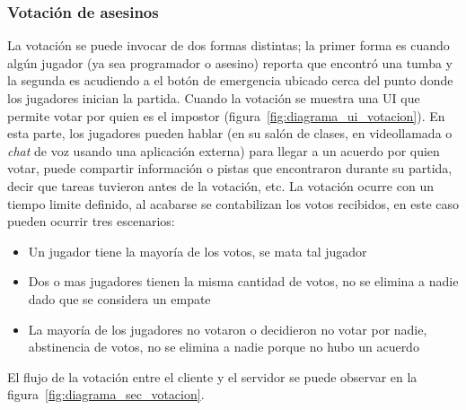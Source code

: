 \subsubsection{Votación de asesinos}
La votación se puede invocar de dos formas distintas; la primer forma es cuando algún jugador (ya sea programador o asesino) reporta que encontró una tumba y la segunda es acudiendo a el botón de emergencia ubicado cerca del punto donde los jugadores inician la partida. Cuando la votación se muestra una UI que permite votar por quien es el impostor (figura~\ref{fig:diagrama_ui_votacion}). En esta parte, los jugadores pueden hablar (en su salón de clases, en videollamada o \textit{chat} de voz usando una aplicación externa) para llegar a un acuerdo por quien votar, puede compartir información o pistas que encontraron durante su partida, decir que tareas tuvieron antes de la votación, etc. La votación ocurre con un tiempo limite definido, al acabarse se contabilizan los votos recibidos, en este caso pueden ocurrir tres escenarios:
\begin{itemize}
    \item Un jugador tiene la mayoría de los votos, se mata tal jugador
    \item Dos o mas jugadores tienen la misma cantidad de votos, no se elimina a nadie dado que se considera un empate
    \item La mayoría de los jugadores no votaron o decidieron no votar por nadie, abstinencia de votos, no se elimina a nadie porque no hubo un acuerdo
\end{itemize}
El flujo de la votación entre el cliente y el servidor se puede observar en la figura~\ref{fig:diagrama_sec_votacion}.

